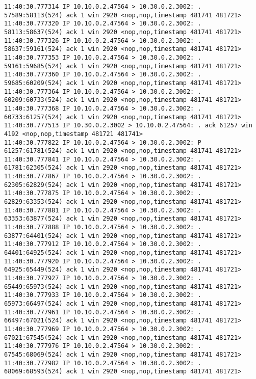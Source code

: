 \documentclass[a4paper,12pt]{article}
\begin{document}
\begin{lstlisting}
11:40:30.777314 IP 10.10.0.2.47564 > 10.30.0.2.3002: . 57589:58113(524) ack 1 win 2920 <nop,nop,timestamp 481741 481721>
11:40:30.777320 IP 10.10.0.2.47564 > 10.30.0.2.3002: . 58113:58637(524) ack 1 win 2920 <nop,nop,timestamp 481741 481721>
11:40:30.777326 IP 10.10.0.2.47564 > 10.30.0.2.3002: . 58637:59161(524) ack 1 win 2920 <nop,nop,timestamp 481741 481721>
11:40:30.777353 IP 10.10.0.2.47564 > 10.30.0.2.3002: . 59161:59685(524) ack 1 win 2920 <nop,nop,timestamp 481741 481721>
11:40:30.777360 IP 10.10.0.2.47564 > 10.30.0.2.3002: . 59685:60209(524) ack 1 win 2920 <nop,nop,timestamp 481741 481721>
11:40:30.777364 IP 10.10.0.2.47564 > 10.30.0.2.3002: . 60209:60733(524) ack 1 win 2920 <nop,nop,timestamp 481741 481721>
11:40:30.777368 IP 10.10.0.2.47564 > 10.30.0.2.3002: . 60733:61257(524) ack 1 win 2920 <nop,nop,timestamp 481741 481721>
11:40:30.777513 IP 10.30.0.2.3002 > 10.10.0.2.47564: . ack 61257 win 4192 <nop,nop,timestamp 481721 481741>
11:40:30.777822 IP 10.10.0.2.47564 > 10.30.0.2.3002: P 61257:61781(524) ack 1 win 2920 <nop,nop,timestamp 481741 481721>
11:40:30.777841 IP 10.10.0.2.47564 > 10.30.0.2.3002: . 61781:62305(524) ack 1 win 2920 <nop,nop,timestamp 481741 481721>
11:40:30.777867 IP 10.10.0.2.47564 > 10.30.0.2.3002: . 62305:62829(524) ack 1 win 2920 <nop,nop,timestamp 481741 481721>
11:40:30.777875 IP 10.10.0.2.47564 > 10.30.0.2.3002: . 62829:63353(524) ack 1 win 2920 <nop,nop,timestamp 481741 481721>
11:40:30.777881 IP 10.10.0.2.47564 > 10.30.0.2.3002: . 63353:63877(524) ack 1 win 2920 <nop,nop,timestamp 481741 481721>
11:40:30.777888 IP 10.10.0.2.47564 > 10.30.0.2.3002: . 63877:64401(524) ack 1 win 2920 <nop,nop,timestamp 481741 481721>
11:40:30.777912 IP 10.10.0.2.47564 > 10.30.0.2.3002: . 64401:64925(524) ack 1 win 2920 <nop,nop,timestamp 481741 481721>
11:40:30.777920 IP 10.10.0.2.47564 > 10.30.0.2.3002: . 64925:65449(524) ack 1 win 2920 <nop,nop,timestamp 481741 481721>
11:40:30.777927 IP 10.10.0.2.47564 > 10.30.0.2.3002: . 65449:65973(524) ack 1 win 2920 <nop,nop,timestamp 481741 481721>
11:40:30.777933 IP 10.10.0.2.47564 > 10.30.0.2.3002: . 65973:66497(524) ack 1 win 2920 <nop,nop,timestamp 481741 481721>
11:40:30.777961 IP 10.10.0.2.47564 > 10.30.0.2.3002: . 66497:67021(524) ack 1 win 2920 <nop,nop,timestamp 481741 481721>
11:40:30.777969 IP 10.10.0.2.47564 > 10.30.0.2.3002: . 67021:67545(524) ack 1 win 2920 <nop,nop,timestamp 481741 481721>
11:40:30.777976 IP 10.10.0.2.47564 > 10.30.0.2.3002: . 67545:68069(524) ack 1 win 2920 <nop,nop,timestamp 481741 481721>
11:40:30.777982 IP 10.10.0.2.47564 > 10.30.0.2.3002: . 68069:68593(524) ack 1 win 2920 <nop,nop,timestamp 481741 481721>

\end{lstlisting}
\end{document}
